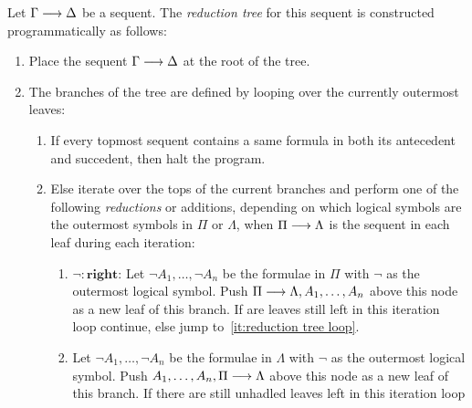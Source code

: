 \documentclass[11pt,a4paper]{article}
\begin{document}
\begin{definition}\label{def:reduction tree}
    Let \(\Gamma\longrightarrow\Delta\) be a sequent.
    The \emph{reduction tree} for this sequent is constructed
    programmatically as follows:
    \begin{enumerate}
        \item\label{it:reduction tree init}
            Place the sequent \(\Gamma\longrightarrow\Delta\) at the root of the tree.
        \item\label{it:reduction tree loop}
            The branches of the tree are defined by looping over the currently
            outermost leaves:
            \begin{enumerate}
                \item\label{it:reduction tree finished}
                    If every topmost sequent contains a same formula
                    in both its antecedent and succedent,
                    then halt the program.
                \item\label{it:reduction tree unfinished}
                    Else iterate over the tops of the current branches
                    and perform one of the following \emph{reductions} or additions,
                    depending on which logical symbols are the outermost symbols in \(\Pi\) or \(\Lambda\),
                    when \(\Pi\longrightarrow\Lambda\) is the sequent in each leaf during each iteration:
                    \begin{enumerate}
                        \item\label{it:reduction tree lnot left}
                            \(\mathbf{\lnot:\text{right}}\):
                            Let \(\lnot A_1,\ldots,\lnot A_n\) be the formulae
                            in \(\Pi\) with \(\lnot\) as the outermost logical symbol.
                            Push \(\Pi\longrightarrow\Lambda, A_1,\ldots,A_n\) above
                            this node as a new leaf of this branch.
                            If are leaves still left in this iteration loop
                            continue, else jump to~\ref{it:reduction tree loop}.
                        \item\label{it:reduction tree lnot right}
                            Let \(\lnot A_1,\ldots,\lnot A_n\) be the formulae
                            in \(\Lambda\) with \(\lnot\) as the outermost logical symbol.
                            Push \(A_1,\ldots,A_n,\Pi\longrightarrow\Lambda\) above
                            this node as a new leaf of this branch.
                            If there are still unhadled leaves left in this iteration loop

\end{enumerate}
\end{enumerate}
\end{enumerate}
\end{definition}
\end{document}
